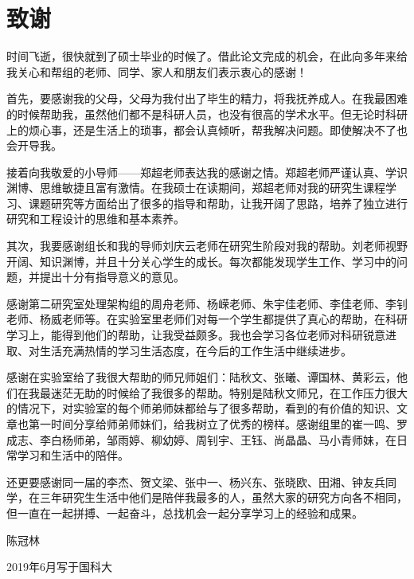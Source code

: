 \chapter[致谢]{致\quad 谢}%
\thispagestyle{noheaderstyle}%

时间飞逝，很快就到了硕士毕业的时候了。借此论文完成的机会，在此向多年来给我关心和帮组的老师、同学、家人和朋友们表示衷心的感谢！

首先，要感谢我的父母，父母为我付出了毕生的精力，将我抚养成人。在我最困难的时候帮助我，虽然他们都不是科研人员，也没有很高的学术水平。但无论时科研上的烦心事，还是生活上的琐事，都会认真倾听，帮我解决问题。即使解决不了也会开导我。

接着向我敬爱的小导师——郑超老师表达我的感谢之情。郑超老师严谨认真、学识渊博、思维敏捷且富有激情。在我硕士在读期间，郑超老师对我的研究生课程学习、课题研究等方面给出了很多的指导和帮助，让我开阔了思路，培养了独立进行研究和工程设计的思维和基本素养。

其次，我要感谢组长和我的导师刘庆云老师在研究生阶段对我的帮助。刘老师视野开阔、知识渊博，并且十分关心学生的成长。每次都能发现学生工作、学习中的问题，并提出十分有指导意义的意见。

感谢第二研究室处理架构组的周舟老师、杨嵘老师、朱宇佳老师、李佳老师、李钊老师、杨威老师等。在实验室里老师们对每一个学生都提供了真心的帮助，在科研学习上，能得到他们的帮助，让我受益颇多。我也会学习各位老师对科研锐意进取、对生活充满热情的学习生活态度，在今后的工作生活中继续进步。

感谢在实验室给了我很大帮助的师兄师姐们：陆秋文、张曦、谭国林、黄彩云，他们在我最迷茫无助的时候给了我很多的帮助。特别是陆秋文师兄，在工作压力很大的情况下，对实验室的每个师弟师妹都给与了很多帮助，看到的有价值的知识、文章也第一时间分享给师弟师妹们，给我树立了优秀的榜样。感谢组里的崔一鸣、罗成志、李白杨师弟，邹雨婷、柳幼婷、周钊宇、王钰、尚晶晶、马小青师妹，在日常学习和生活中的陪伴。

还更要感谢同一届的李杰、贺文梁、张中一、杨兴东、张晓欧、田湘、钟友兵同学，在三年研究生生活中他们是陪伴我最多的人，虽然大家的研究方向各不相同，但一直在一起拼搏、一起奋斗，总找机会一起分享学习上的经验和成果。

\begin{flushright}
陈冠林

2019年6月写于国科大
\end{flushright}
